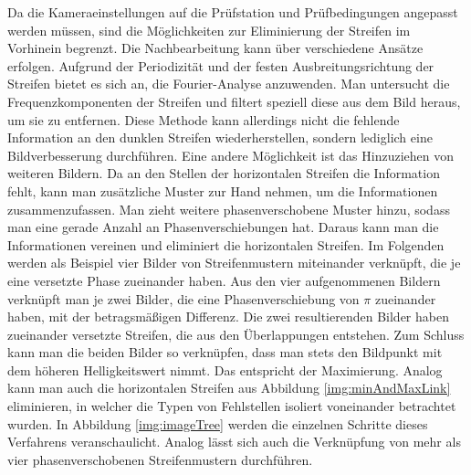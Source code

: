 Da die Kameraeinstellungen auf die Prüfstation und Prüfbedingungen angepasst werden müssen, sind die Möglichkeiten zur Eliminierung der Streifen im Vorhinein begrenzt.
Die Nachbearbeitung kann über verschiedene Ansätze erfolgen.
Aufgrund der Periodizität und der festen Ausbreitungsrichtung der Streifen bietet es sich an, die Fourier-Analyse anzuwenden.
Man untersucht die Frequenzkomponenten der Streifen und filtert speziell diese aus dem Bild heraus, um sie zu entfernen.
Diese Methode kann allerdings nicht die fehlende Information an den dunklen Streifen wiederherstellen, sondern lediglich eine Bildverbesserung durchführen.
Eine andere Möglichkeit ist das Hinzuziehen von weiteren Bildern.
Da an den Stellen der horizontalen Streifen die Information fehlt, kann man zusätzliche Muster zur Hand nehmen, um die Informationen zusammenzufassen.
Man zieht weitere phasenverschobene Muster hinzu, sodass man eine gerade Anzahl an Phasenverschiebungen hat.
Daraus kann man die Informationen vereinen und eliminiert die horizontalen Streifen.
Im Folgenden werden als Beispiel vier Bilder von Streifenmustern miteinander verknüpft, die je eine versetzte Phase zueinander haben.
Aus den vier aufgenommenen Bildern verknüpft man je zwei Bilder, die eine Phasenverschiebung von $\pi$ zueinander haben, mit der betragsmäßigen Differenz.
Die zwei resultierenden Bilder haben zueinander versetzte Streifen, die aus den Überlappungen entstehen.
Zum Schluss kann man die beiden Bilder so verknüpfen, dass man stets den Bildpunkt mit dem höheren Helligkeitswert nimmt.
Das entspricht der Maximierung.
Analog kann man auch die horizontalen Streifen aus Abbildung \ref{img:minAndMaxLink} eliminieren, in welcher die Typen von Fehlstellen isoliert voneinander betrachtet wurden.
In Abbildung \ref{img:imageTree} werden die einzelnen Schritte dieses Verfahrens veranschaulicht.
Analog lässt sich auch die Verknüpfung von mehr als vier phasenverschobenen Streifenmustern durchführen.

